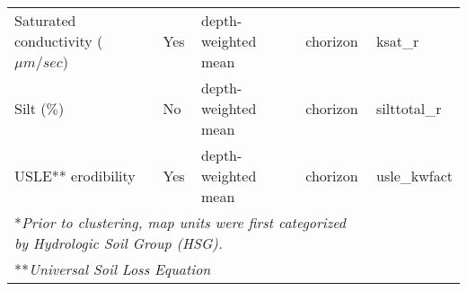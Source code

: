 \begin{table}[h]
\begin{tabular}{lllll}
		Saturated conductivity ($\mu m / sec$) & Yes                  & depth-weighted mean & chorizon     & ksat\_r      \\
		Silt ($\%$)                            & No                 & depth-weighted mean & chorizon     & silttotal\_r \\
		USLE** erodibility                     & Yes                 & depth-weighted mean     & chorizon     & usle\_kwfact \\
		\hline
		\multicolumn{4}{l}{*\textit{Prior to clustering, map units were first categorized by Hydrologic Soil Group (HSG).}} \\
		\multicolumn{4}{l}{**\textit{Universal Soil Loss Equation}}
		\label{table:soil_attr_in_swat}
	\end{tabular}
\end{table}